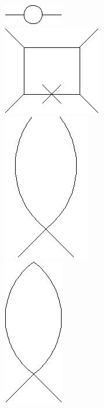 \documentclass{article}
\begin{document}
\includegraphics[scale=0.3]{OPE/6.jpg}\\
\includegraphics[scale=0.3]{OPE/7.jpg}\\
\includegraphics[scale=0.3]{OPE/openfish.jpg}\\
\includegraphics[scale=0.3]{OPE/closedfish.jpg}\\

\newpage

 

\end{document}
